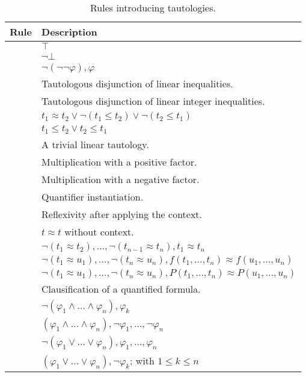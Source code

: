 \begin{xltabular}{\linewidth}{l X}
\caption{Rules introducing tautologies.}
\label{rule-tab:tautologies}\\
  Rule & Description \\
  \hline
{} & $\top$ \\
 & $\neg\bot$ \\
 & $\neg(\neg\neg\varphi), \varphi$ \\
 & Tautologous disjunction of linear inequalities. \\
 & Tautologous disjunction of linear integer inequalities. \\
 & $t_1 ≈ t_2 \lor \neg (t_1 \leq t_2) \lor \neg (t_2 \leq t_1)$ \\
 & $t_1 \leq t_2 \lor t_2 \leq t_1$ \\
 & A trivial linear tautology. \\
 & Multiplication with a positive factor. \\
 & Multiplication with a negative factor.\\
 & Quantifier instantiation. \\
 & Reflexivity after applying the context. \\
 & $t ≈ t$ without context. \\
 & $\neg (t_1 ≈ t_2) , \dots , \neg (t_{n-1} ≈ t_n) , t_1 ≈ t_n$ \\
 & $\neg (t_1 ≈ u_1) , \dots , \neg (t_n ≈ u_n) , f(t_1, \dots, t_n) ≈ f(u_1, \dots, u_n)$ \\
 & $\neg (t_1 ≈ u_1) , \dots , \neg (t_n ≈ u_n) , P(t_1, \dots, t_n) ≈ P(u_1, \dots, u_n)$ \\
 & Clausification of a quantified formula. \\
 & $\neg (\varphi_1 \land \dots \land \varphi_n) , \varphi_k $ \\
 & $ (\varphi_1 \land \dots \land \varphi_n), \neg\varphi_1  , \dots , \neg\varphi_n $ \\
 & $ \neg (\varphi_1 \lor \dots \lor \varphi_n) , \varphi_1 , \dots , \varphi_n $ \\
 & $ (\varphi_1 \lor \dots \lor \varphi_n) , \neg \varphi_k $; with $1\leq k \leq n$ \\

\end{xltabular}
